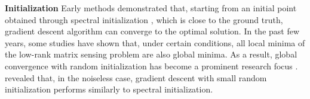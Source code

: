 \textbf{Initialization} Early methods demonstrated that, starting from an initial point obtained through spectral initialization \cite{chen2015fast,sun2016guaranteed}, which is close to the ground truth, gradient descent algorithm can converge to the optimal solution. In the past few years, some studies \cite{bhojanapalli2016global,zhang2019sharp,ge2016matrix,ge2017no,zhu2021global} have shown that, under certain conditions, all local minima of the low-rank matrix sensing problem are also global minima. As a result, global convergence with random initialization has become a prominent research focus \cite{jin2023understanding,ding2022validation,jiang2023algorithmic,soltanolkotabi2023implicit,chengradient,jia2024preconditioning,jia2024globally}. \cite{stoger2021small,soltanolkotabi2023implicit} revealed that, in the noiseless case, gradient descent with small random initialization performs similarly to spectral initialization.